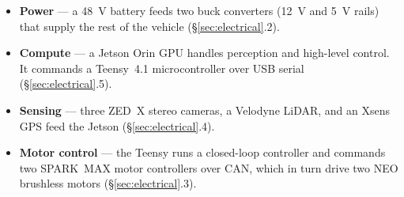 \documentclass[12pt, letterpaper]{article}
\begin{document}
\begin{itemize}
  \item \textbf{Power} --- a 48~V battery feeds two buck converters (12~V and 5~V
    rails) that supply the rest of the vehicle (\S\ref{sec:electrical}.2).
  \item \textbf{Compute} --- a Jetson Orin GPU handles perception and high-level
    control. It commands a Teensy~4.1 microcontroller over USB serial
    (\S\ref{sec:electrical}.5).
  \item \textbf{Sensing} --- three ZED~X stereo cameras, a Velodyne LiDAR, and an
    Xsens GPS feed the Jetson (\S\ref{sec:electrical}.4).
  \item \textbf{Motor control} --- the Teensy runs a closed-loop controller and
    commands two SPARK~MAX motor controllers over CAN, which in turn drive
    two NEO brushless motors (\S\ref{sec:electrical}.3).
\end{itemize}
\end{document}
